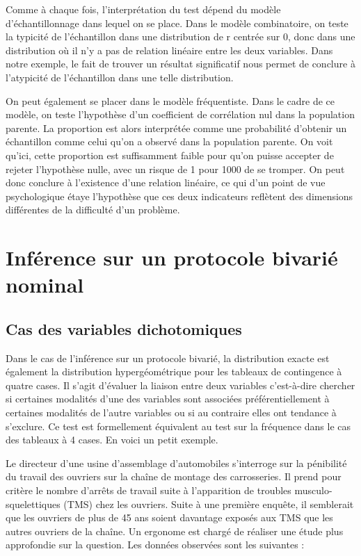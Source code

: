 \documentclass[]{book}
\theoremstyle{definition}
\theoremstyle{definition}
\theoremstyle{definition}
\theoremstyle{remark}
\begin{document}
Comme à chaque fois, l'interprétation du test dépend du modèle
d'échantillonnage dans lequel on se place. Dans le modèle combinatoire,
on teste la typicité de l'échantillon dans une distribution de r centrée
sur 0, donc dans une distribution où il n'y a pas de relation linéaire
entre les deux variables. Dans notre exemple, le fait de trouver un
résultat significatif nous permet de conclure à l'atypicité de
l'échantillon dans une telle distribution.

On peut également se placer dans le modèle fréquentiste. Dans le cadre
de ce modèle, on teste l'hypothèse d'un coefficient de corrélation nul
dans la population parente. La proportion est alors interprétée comme
une probabilité d'obtenir un échantillon comme celui qu'on a observé
dans la population parente. On voit qu'ici, cette proportion est
suffisamment faible pour qu'on puisse accepter de rejeter l'hypothèse
nulle, avec un risque de 1 pour 1000 de se tromper. On peut donc
conclure à l'existence d'une relation linéaire, ce qui d'un point de vue
psychologique étaye l'hypothèse que ces deux indicateurs reflètent des
dimensions différentes de la difficulté d'un problème.

\hypertarget{inference-sur-un-protocole-bivarie-nominal}{%
\section{Inférence sur un protocole bivarié
nominal}\label{inference-sur-un-protocole-bivarie-nominal}}

\hypertarget{cas-des-variables-dichotomiques}{%
\subsection{Cas des variables
dichotomiques}\label{cas-des-variables-dichotomiques}}

Dans le cas de l'inférence sur un protocole bivarié, la distribution
exacte est également la distribution hypergéométrique pour les tableaux
de contingence à quatre cases. Il s'agit d'évaluer la liaison entre deux
variables c'est-à-dire chercher si certaines modalités d'une des
variables sont associées préférentiellement à certaines modalités de
l'autre variables ou si au contraire elles ont tendance à s'exclure. Ce
test est formellement équivalent au test sur la fréquence dans le cas
des tableaux à 4 cases. En voici un petit exemple.

Le directeur d'une usine d'assemblage d'automobiles s'interroge sur la
pénibilité du travail des ouvriers sur la chaîne de montage des
carrosseries. Il prend pour critère le nombre d'arrêts de travail suite
à l'apparition de troubles musculo-squelettiques (TMS) chez les
ouvriers. Suite à une première enquête, il semblerait que les ouvriers
de plus de 45 ans soient davantage exposés aux TMS que les autres
ouvriers de la chaîne. Un ergonome est chargé de réaliser une étude plus
approfondie sur la question. Les données observées sont les suivantes :
\end{document}
